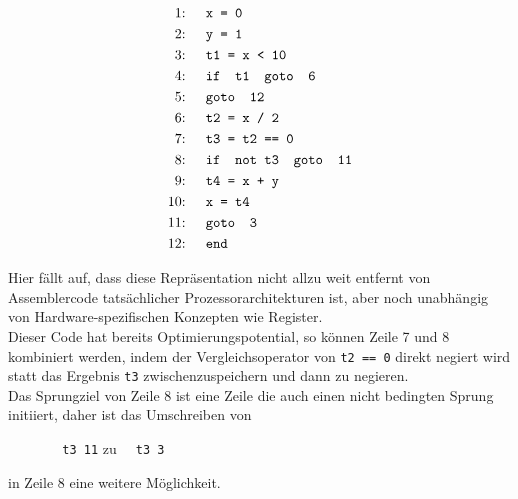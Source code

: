 \begin{figure}[H]
  \begin{align*}
    \text{1: }\quad &\texttt{x = 0}\\
    \text{2: }\quad &\texttt{y = 1}\\
    \text{3: }\quad &\texttt{t1 = x < 10}\\
    \text{4: }\quad &\texttt{\text{if } t1 \text{ goto } 6}\\
    \text{5: }\quad &\texttt{\text{goto } 12}\\
    \text{6: }\quad &\texttt{t2 = x\ /\ 2}\\
    \text{7: }\quad &\texttt{t3 = t2 == 0}\\
    \text{8: }\quad &\texttt{\text{if } \text{not}\ t3 \text{ goto } 11}\\
    \text{9: }\quad &\texttt{t4 = x + y}\\
    \text{10: }\quad &\texttt{x = t4}\\
    \text{11: }\quad &\texttt{\text{goto } 3}\\
    \text{12: }\quad &\texttt{\text{end}}
  \end{align*}
\end{figure}

Hier fällt auf, dass diese Repräsentation nicht allzu weit entfernt von Assemblercode tatsächlicher Prozessorarchitekturen ist, aber noch unabhängig von Hardware-spezifischen Konzepten wie Register.\\
Dieser Code hat bereits Optimierungspotential, so können Zeile 7 und 8 kombiniert werden, indem der Vergleichsoperator von \texttt{t2 == 0} direkt negiert wird statt das Ergebnis \texttt{t3} zwischenzuspeichern und dann zu negieren.\\
Das Sprungziel von Zeile 8 ist eine Zeile die auch einen nicht bedingten Sprung initiiert, daher ist das Umschreiben von
\begin{figure}[H]
  \centering
  \texttt{ \ t3  11}
\qquad
zu\qquad
  \texttt{ \ t3  3}
\end{figure}
in Zeile 8 eine weitere Möglichkeit.
